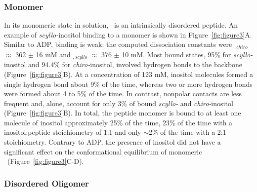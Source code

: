 \subsubsection{Monomer}
In its monomeric state in solution, \gafour\ is an intrinsically disordered peptide.\cite{Nikolic:2011p57} An example of \textit{scyllo-}inositol binding to a monomer is shown in Figure~\ref{fig:figure3}A. Similar to ADP, binding is weak: the computed dissociation constants were \KD$_{,chiro}$  $\approx$ 362 $\pm$ 16 mM and \KD$_{,scyllo}$  $\approx$ 376 $\pm$ 10 mM. Most bound states, 95\% for \textit{scyllo-}inositol and 94.4\% for \textit{chiro-}inositol, involved hydrogen bonds to the backbone (Figure~\ref{fig:figure3}B). At a concentration of 123 mM, inositol molecules formed a single hydrogen bond about 9\% of the time, whereas two or more hydrogen bonds were formed about 4 to 5\% of the time. In contrast, nonpolar contacts are less frequent and, alone, account for only 3\% of bound \textit{scyllo-} and \textit{chiro-}inositol (Figure~\ref{fig:figure3}B). In total, the peptide monomer is bound to at least one molecule of inositol approximately 25\% of the time, 23\% of the time with a inositol:peptide stoichiometry of 1:1 and only $\sim$2\% of the time with a 2:1 stoichiometry. Contrary to ADP, the presence of inositol did not have a significant effect on the conformational equilibrium of monomeric \gafour\ (Figure~\ref{fig:figure3}C-D).

\subsubsection{Disordered Oligomer}

